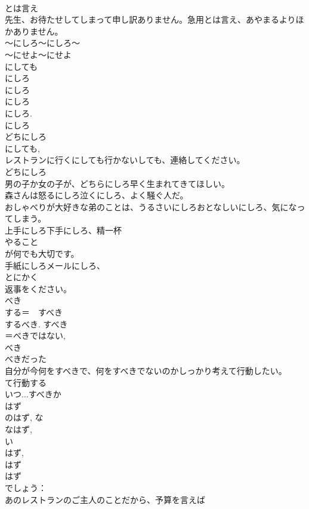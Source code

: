 \documentclass[8pt]{extreport}
\begin{document}
\begin{CJK}{UTF8}{min}
\\	とは言え
\\	先生、お待たせしてしまって申し訳ありません。急用とは言え、あやまるよりほかありません。　
\\	～にしろ～にしろ～
\\	～にせよ～にせよ
\\	にしても 
\\	にしろ
\\	にしろ 
\\	にしろ
\\	にしろ. 
\\	にしろ 
\\	どちにしろ 
\\	にしても, 
\\	レストランに行くにしても行かないしても、連絡してください。
\\	どちにしろ 
\\	男の子か女の子が、どちらにしろ早く生まれてきてほしい。
\\	森さんは怒るにしろ泣くにしろ、よく騒ぐ人だ。
\\	おしゃべりが大好きな弟のことは、うるさいにしろおとなしいにしろ、気になってしまう。
\\	上手にしろ下手にしろ、精一杯
\\	やること
\\	が何でも大切です。
\\	手紙にしろメールにしろ、
\\	とにかく
\\	返事をください。
\\	べき
\\	する＝　すべき 
\\	するべき. すべき 
\\	＝べきではない, 
\\	べき
\\	べきだった 
\\	自分が今何をすべきで、何をすべきでないのかしっかり考えて行動したい。
\\	て行動する
\\	いつ...すべきか
\\	はず
\\	のはず, な
\\	なはず, 
\\	い
\\	はず, 
\\	はず
\\	はず 
\\	でしょう：
\\	あのレストランのご主人のことだから、予算を言えば

\end{CJK}
\end{document}
